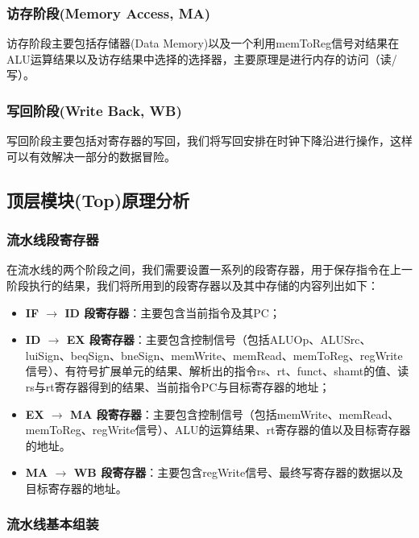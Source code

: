 \documentclass{cumcm}
\numberwithin{equation}{section}
\numberwithin{equation}{subsection}
\begin{document}
\subsubsection{访存阶段(Memory Access, MA)}\label{section2.2.4}
访存阶段主要包括存储器(Data Memory)以及一个利用memToReg信号对结果在ALU运算结果以及访存结果中选择的选择器，主要原理是进行内存的访问（读/写）。

\subsubsection{写回阶段(Write Back, WB)}\label{section2.2.5}
写回阶段主要包括对寄存器的写回，我们将写回安排在时钟下降沿进行操作，这样可以有效解决一部分的数据冒险。

\subsection{顶层模块(Top)原理分析}\label{section2.3}

\subsubsection{流水线段寄存器}\label{section2.3.1}

在流水线的两个阶段之间，我们需要设置一系列的段寄存器，用于保存指令在上一阶段执行的结果，我们将所用到的段寄存器以及其中存储的内容列出如下：

\begin{itemize}
    \item \textbf{IF $\rightarrow$ ID 段寄存器}：主要包含当前指令及其PC；
    \item \textbf{ID $\rightarrow$ EX 段寄存器}：主要包含控制信号（包括ALUOp、ALUSrc、luiSign、beqSign、bneSign、memWrite、memRead、memToReg、regWrite信号）、有符号扩展单元的结果、解析出的指令rs、rt、funct、shamt的值、读rs与rt寄存器得到的结果、当前指令PC与目标寄存器的地址；
    \item \textbf{EX $\rightarrow$ MA 段寄存器}：主要包含控制信号（包括memWrite、memRead、memToReg、regWrite信号）、ALU的运算结果、rt寄存器的值以及目标寄存器的地址。
    \item \textbf{MA $\rightarrow$ WB 段寄存器}：主要包含regWrite信号、最终写寄存器的数据以及目标寄存器的地址。
\end{itemize}

\subsubsection{流水线基本组装}\label{section2.3.2}
\end{document}
